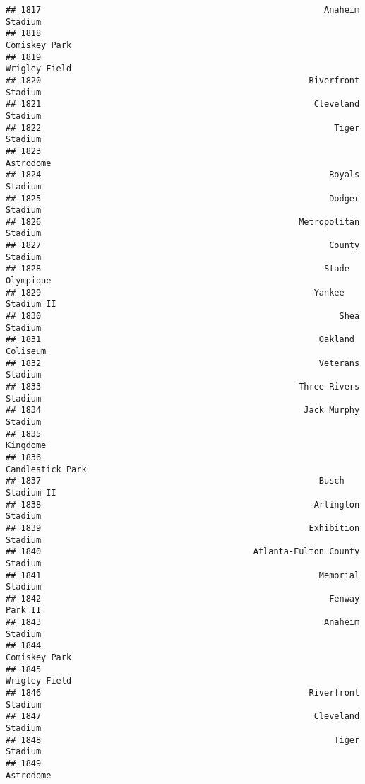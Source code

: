 \documentclass[]{article}
\begin{document}
\begin{verbatim}
## 1817                                                        Anaheim Stadium
## 1818                                                          Comiskey Park
## 1819                                                          Wrigley Field
## 1820                                                     Riverfront Stadium
## 1821                                                      Cleveland Stadium
## 1822                                                          Tiger Stadium
## 1823                                                              Astrodome
## 1824                                                         Royals Stadium
## 1825                                                         Dodger Stadium
## 1826                                                   Metropolitan Stadium
## 1827                                                         County Stadium
## 1828                                                        Stade Olympique
## 1829                                                      Yankee Stadium II
## 1830                                                           Shea Stadium
## 1831                                                       Oakland Coliseum
## 1832                                                       Veterans Stadium
## 1833                                                   Three Rivers Stadium
## 1834                                                    Jack Murphy Stadium
## 1835                                                               Kingdome
## 1836                                                       Candlestick Park
## 1837                                                       Busch Stadium II
## 1838                                                      Arlington Stadium
## 1839                                                     Exhibition Stadium
## 1840                                          Atlanta-Fulton County Stadium
## 1841                                                       Memorial Stadium
## 1842                                                         Fenway Park II
## 1843                                                        Anaheim Stadium
## 1844                                                          Comiskey Park
## 1845                                                          Wrigley Field
## 1846                                                     Riverfront Stadium
## 1847                                                      Cleveland Stadium
## 1848                                                          Tiger Stadium
## 1849                                                              Astrodome

\end{verbatim}
\end{document}
